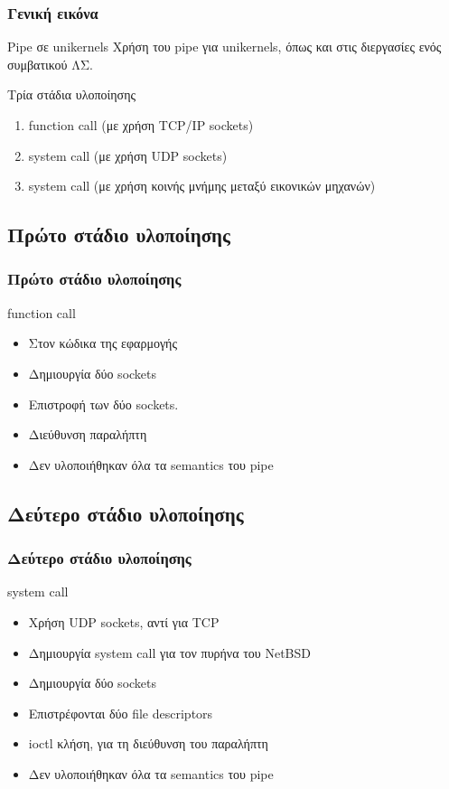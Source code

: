 \documentclass[red,slidestop,notes,compress,mathserif]{beamer}
\begin{document}
\begin{frame}
\frametitle{Γενική εικόνα}
\begin{block}{Pipe σε unikernels}
Χρήση του pipe για unikernels, όπως και στις διεργασίες ενός συμβατικού ΛΣ.
\end{block}
\begin{block}{Τρία στάδια υλοποίησης}
\begin{enumerate}
\item function call (με χρήση TCP/IP sockets)
\item system call (με χρήση UDP sockets)
\item system call (με χρήση κοινής μνήμης μεταξύ εικονικών μηχανών)
\end{enumerate}
\end{block}
\end{frame}

\subsection{Πρώτο στάδιο υλοποίησης}

\begin{frame}
\frametitle{Πρώτο στάδιο υλοποίησης}
\begin{block}{function call}
\begin{itemize}
\item Στον κώδικα της εφαρμογής
\item Δημιουργία δύο sockets
\item Επιστροφή των δύο sockets.
\item Διεύθυνση παραλήπτη
\item Δεν υλοποιήθηκαν όλα τα semantics του pipe 
\end{itemize}
\end{block}
\end{frame}

\subsection{Δεύτερο στάδιο υλοποίησης}

\begin{frame}
\frametitle{Δεύτερο στάδιο υλοποίησης}
\begin{block}{system call}
\begin{itemize}
\item Χρήση UDP sockets, αντί για TCP
\item Δημιουργία system call για τον πυρήνα του NetBSD
\item Δημιουργία δύο sockets
\item Επιστρέφονται δύο file descriptors
\item ioctl κλήση, για τη διεύθυνση του παραλήπτη
\item Δεν υλοποιήθηκαν όλα τα semantics του pipe 
\end{itemize}
\end{block}
\end{frame}
\end{document}
